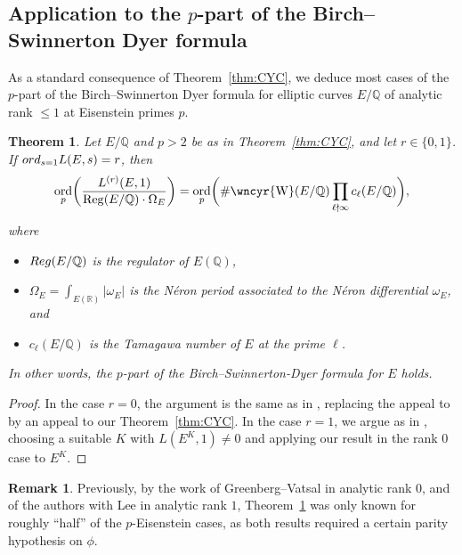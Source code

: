 \documentclass[a4paper,10pt]{amsart}
\numberwithin{equation}{section}
\numberwithin{equation}{section}
\theoremstyle{plain}
\theoremstyle{definition}
\newtheorem{rem}[thm]{Remark}
\theoremstyle{definition}
\theoremstyle{plain}
\theoremstyle{plain}
\theoremstyle{plain}
\theoremstyle{plain}
\newtheorem{thmintro}{Theorem}
\DeclareMathOperator{\ord}{ord}
\newcommand{\Q}{\mathbb{Q}}
\newcommand{\sha}{\text{\wncyr{W}}}
\begin{document}
\subsection{Application to the $p$-part of the Birch--Swinnerton Dyer formula}

As a standard consequence of Theorem~\ref{thm:CYC}, 
 we deduce most cases of the $p$-part of the Birch--Swinnerton Dyer formula for elliptic curves $E/\Q$ of analytic rank $\leq 1$ at Eisenstein primes $p$. 

\begin{thmintro}\label{thm:pBSD}
Let $E/\Q$ and $p>2$ be as in Theorem~\ref{thm:CYC}, and let $r\in\{0,1\}$. If ${\rm ord}_{s=1}L(E,s)=r$, then
\begin{displaymath}
\ord_{p}\biggl(\frac{L^{(r)}(E, 1)}{\operatorname{Reg}(E / \Q) \cdot \Omega_{E}}\biggr)=\ord_{p}\biggl(\# \sha(E / \Q) \prod_{\ell \nmid \infty} c_{\ell}(E / \Q)\biggr),
\end{displaymath}
where 
\begin{itemize}
\item ${\rm Reg}(E/\Q)$ is the regulator of $E(\Q)$, 
\item $\Omega_E=\int_{E(\mathbb{R})}\vert\omega_E\vert$ is the N\'{e}ron  period associated to the N\'{e}ron differential $\omega_E$, and 
\item $c_\ell(E/\Q)$ is the Tamagawa number of $E$ at the prime $\ell$.
\end{itemize}
In other words, the $p$-part of the Birch--Swinnerton-Dyer formula for $E$ holds.
\end{thmintro}

\begin{proof}
In the case $r=0$, the argument is the same as in  \cite[Thm.~5.1.4]{eisenstein}, replacing the appeal to \cite[Thm.~1.3]{greenvats} by an appeal to our Theorem~\ref{thm:CYC}. In the case $r=1$, we argue as in \cite[Thm.~5.3.1]{eisenstein}, choosing a suitable $K$ with $L(E^K,1)\neq 0$ and applying our result in the rank $0$ case  to $E^K$.
\end{proof}

\begin{rem}
Previously, by the work of Greenberg--Vatsal \cite{greenvats} in analytic rank $0$, and of the authors with Lee \cite{eisenstein} in analytic rank $1$, Theorem~\ref{thm:pBSD} was only known for roughly ``half'' of the $p$-Eisenstein cases, as both results required a certain parity hypothesis on $\phi$.
\end{rem}
\end{document}
